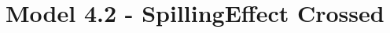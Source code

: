 \documentclass[]{report}
\begin{document}


\chapter{Model 4.2 - SpillingEffect Crossed}
\end{document}
